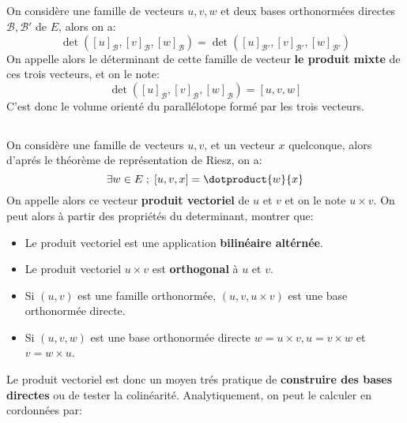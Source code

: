 \subsection*{}
On considère une famille de vecteurs \(u, v, w\) et deux bases orthonormées directes \(\mathscr{B}, \mathscr{B}'\) de \(E\), alors on a:
\[
   \det([u]_\mathscr{B}, [v]_\mathscr{B}, [w]_\mathscr{B}) = \det([u]_{\mathscr{B}'}, [v]_{\mathscr{B}'}, [w]_{\mathscr{B}'})
\]
On appelle alors le déterminant de cette famille de vecteur \textbf{le produit mixte} de ces trois vecteurs, et on le note:
\[
   \det([u]_\mathscr{B}, [v]_\mathscr{B}, [w]_\mathscr{B}) = [u, v, w]
\]
C'est donc le volume orienté du parallélotope formé par les trois vecteurs.

\subsection*{}
On considère une famille de vecteurs \(u, v\), et un vecteur \(x\) quelconque, alors d'aprés le théorème de représentation de Riesz, on a:
\[
   \exists w \in E \; ; \; [u, v, x] = \dotproduct{w}{x}  
\]
On appelle alors ce vecteur \textbf{produit vectoriel} de \(u\) et \(v\) et on le note \(u \times v\). On peut alors à partir des propriétés du determinant, montrer que:
\begin{itemize}
   \item Le produit vectoriel est une application \textbf{bilinéaire altérnée}.
   \item Le produit vectoriel \(u \times v\) est \textbf{orthogonal} à \(u\) et \(v\).
   \item Si \((u, v)\) est une famille orthonormée, \((u, v, u \times v)\) est une base orthonormée directe.
   \item Si \((u, v, w)\) est une base orthonormée directe \(w = u \times v, u = v \times w\) et \(v = w \times u\).
\end{itemize}
Le produit vectoriel est donc un moyen trés pratique de \textbf{construire des bases directes} ou de tester la colinéarité. Analytiquement, on peut le calculer en cordonnées par:
